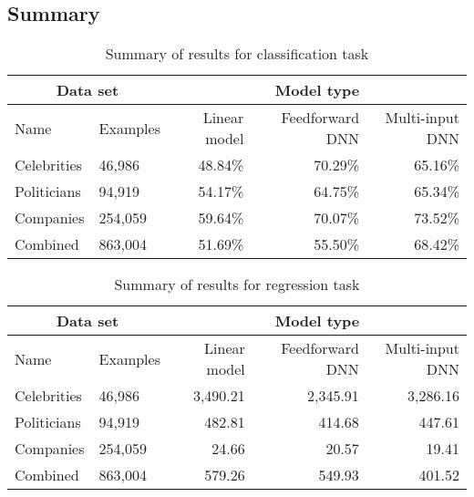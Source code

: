 \subsection{Summary}
\label{sec:res_summary}

\begin{table}
\begin{tabular}{llrrr}
\toprule
\multicolumn{2}{c}{Data set} & \multicolumn{3}{c}{Model type} \\
\midrule
Name & Examples & Linear model & Feedforward DNN & Multi-input DNN \\
\midrule
Celebrities & 46,986 & 48.84\% & 70.29\% & 65.16\% \\
Politicians & 94,919 & 54.17\% & 64.75\% & 65.34\% \\
Companies & 254,059 & 59.64\% & 70.07\% & 73.52\% \\
Combined & 863,004 & 51.69\% & 55.50\% & 68.42\% \\
\bottomrule
\end{tabular}
\caption{Summary of results for classification task}
\label{tab:summary_classification}
\end{table}

\begin{table}
\begin{tabular}{llrrr}
\toprule
\multicolumn{2}{c}{Data set} & \multicolumn{3}{c}{Model type} \\
\midrule
Name & Examples & Linear model & Feedforward DNN & Multi-input DNN \\
\midrule
Celebrities & 46,986 & 3,490.21 & 2,345.91 & 3,286.16 \\
Politicians & 94,919 & 482.81 & 414.68 & 447.61 \\
Companies & 254,059 & 24.66 & 20.57 & 19.41 \\
Combined & 863,004 & 579.26 & 549.93 & 401.52 \\
\bottomrule
\end{tabular}
\caption{Summary of results for regression task}
\label{tab:summary_classification}
\end{table}


